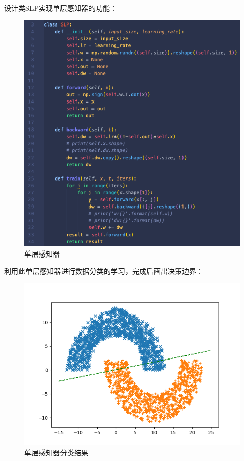 \documentclass{article}
\begin{document}
设计类SLP实现单层感知器的功能：
\begin{figure}[H]
	\centering
	\includegraphics[scale=0.4]{slp.png}
	\caption{单层感知器}
\end{figure}

利用此单层感知器进行数据分类的学习，完成后画出决策边界：
\begin{figure}[H]
	\centering
	\includegraphics[scale=0.6]{code/slp.png}
	\caption{单层感知器分类结果}
\end{figure}
\end{document}
